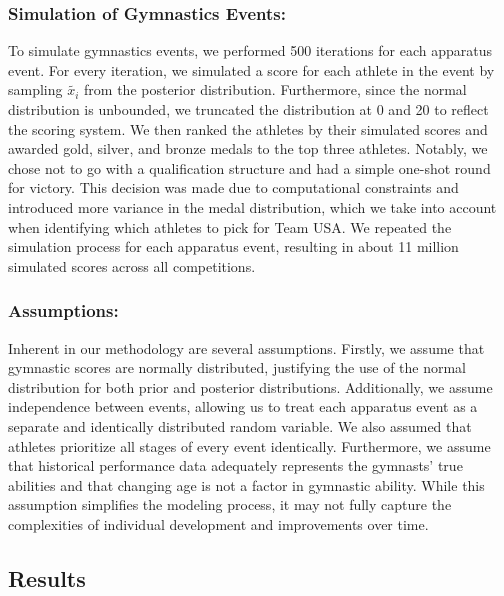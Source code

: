 \documentclass[
  letterpaper,
  DIV=11,
  numbers=noendperiod]{scrartcl}
\begin{document}
\hypertarget{simulation-of-gymnastics-events}{%
\subsubsection{Simulation of Gymnastics
Events:}\label{simulation-of-gymnastics-events}}

To simulate gymnastics events, we performed 500 iterations for each
apparatus event. For every iteration, we simulated a score for each
athlete in the event by sampling \(\tilde{x_i}\) from the posterior
distribution. Furthermore, since the normal distribution is unbounded,
we truncated the distribution at 0 and 20 to reflect the scoring system.
We then ranked the athletes by their simulated scores and awarded gold,
silver, and bronze medals to the top three athletes. Notably, we chose
not to go with a qualification structure and had a simple one-shot round
for victory. This decision was made due to computational constraints and
introduced more variance in the medal distribution, which we take into
account when identifying which athletes to pick for Team USA. We
repeated the simulation process for each apparatus event, resulting in
about 11 million simulated scores across all competitions.

\hypertarget{assumptions}{%
\subsubsection{Assumptions:}\label{assumptions}}

Inherent in our methodology are several assumptions. Firstly, we assume
that gymnastic scores are normally distributed, justifying the use of
the normal distribution for both prior and posterior distributions.
Additionally, we assume independence between events, allowing us to
treat each apparatus event as a separate and identically distributed
random variable. We also assumed that athletes prioritize all stages of
every event identically. Furthermore, we assume that historical
performance data adequately represents the gymnasts' true abilities and
that changing age is not a factor in gymnastic ability. While this
assumption simplifies the modeling process, it may not fully capture the
complexities of individual development and improvements over time.

\hypertarget{results}{%
\subsection{Results}\label{results}}
\end{document}
